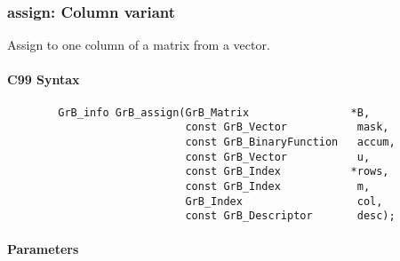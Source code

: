 \subsubsection{{\sf assign}: Column variant}

Assign to one column of a matrix from a vector.  

\paragraph{C99 Syntax}

\begin{verbatim}
        GrB_info GrB_assign(GrB_Matrix                *B,
                            const GrB_Vector           mask,
                            const GrB_BinaryFunction   accum,
                            const GrB_Vector           u,
                            const GrB_Index           *rows,
                            const GrB_Index            m,
                            GrB_Index                  col,
                            const GrB_Descriptor       desc); 
\end{verbatim}

\paragraph{Parameters}

